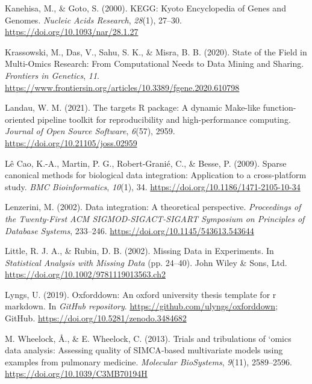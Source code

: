\documentclass[a4paper, nobind]{templates/ociamthesis}
\newlength{\cslhangindent}
\newenvironment{CSLReferences}[2] %
 {%
  \setlength{\parindent}{0pt}
  \ifodd #1
  \let\oldpar\par
  \def\par{\hangindent=\cslhangindent\oldpar}
  \fi
  \setlength{\parskip}{1mm}
  \setlength{\baselineskip}{6mm}
 }%
 {}
\begin{document}
\begin{CSLReferences}{1}{0}
\leavevmode{}%
Kanehisa, M., \& Goto, S. (2000). {KEGG}: {Kyoto} {Encyclopedia} of {Genes} and {Genomes}. \emph{Nucleic Acids Research}, \emph{28}(1), 27--30. \url{https://doi.org/10.1093/nar/28.1.27}

\leavevmode{}%
Krassowski, M., Das, V., Sahu, S. K., \& Misra, B. B. (2020). State of the {Field} in {Multi}-{Omics} {Research}: {From} {Computational} {Needs} to {Data} {Mining} and {Sharing}. \emph{Frontiers in Genetics}, \emph{11}. \url{https://www.frontiersin.org/articles/10.3389/fgene.2020.610798}

\leavevmode{}%
Landau, W. M. (2021). The targets {R} package: A dynamic {Make}-like function-oriented pipeline toolkit for reproducibility and high-performance computing. \emph{Journal of Open Source Software}, \emph{6}(57), 2959. \url{https://doi.org/10.21105/joss.02959}

\leavevmode{}%
Lê Cao, K.-A., Martin, P. G., Robert-Granié, C., \& Besse, P. (2009). Sparse canonical methods for biological data integration: Application to a cross-platform study. \emph{BMC Bioinformatics}, \emph{10}(1), 34. \url{https://doi.org/10.1186/1471-2105-10-34}

\leavevmode{}%
Lenzerini, M. (2002). Data integration: A theoretical perspective. \emph{Proceedings of the Twenty-First {ACM} {SIGMOD}-{SIGACT}-{SIGART} Symposium on {Principles} of Database Systems}, 233--246. \url{https://doi.org/10.1145/543613.543644}

\leavevmode{}%
Little, R. J. A., \& Rubin, D. B. (2002). Missing {Data} in {Experiments}. In \emph{Statistical {Analysis} with {Missing} {Data}} (pp. 24--40). John Wiley \& Sons, Ltd. \url{https://doi.org/10.1002/9781119013563.ch2}

\leavevmode{}%
Lyngs, U. (2019). Oxforddown: An oxford university thesis template for r markdown. In \emph{GitHub repository}. \url{https://github.com/ulyngs/oxforddown}; GitHub. \url{https://doi.org/10.5281/zenodo.3484682}

\leavevmode{}%
M. Wheelock, Å., \& E. Wheelock, C. (2013). Trials and tribulations of `omics data analysis: Assessing quality of {SIMCA}-based multivariate models using examples from pulmonary medicine. \emph{Molecular BioSystems}, \emph{9}(11), 2589--2596. \url{https://doi.org/10.1039/C3MB70194H}


\end{CSLReferences}
\end{document}
